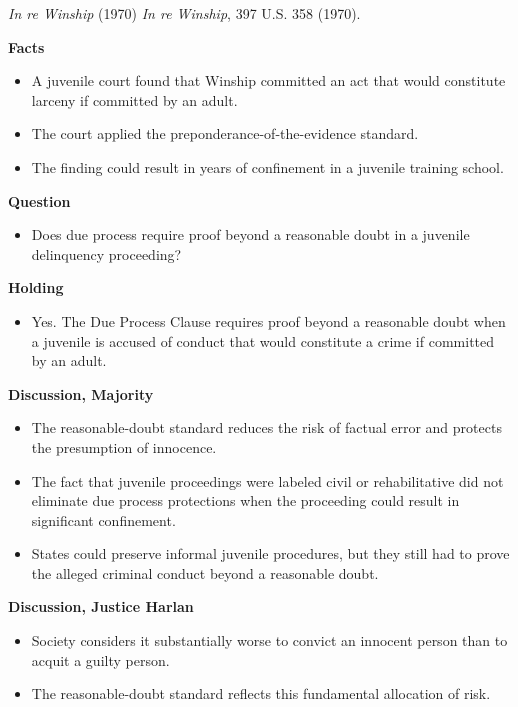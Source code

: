 \documentclass[11pt]{tex/lawoutline}
\begin{document}
\casebox
{\textit{In re Winship} (1970)}
{\textit{In re Winship}, 397 U.S. 358 (1970).}
{
\textbf{Facts}
\begin{itemize}
    \item A juvenile court found that Winship committed an act that would constitute larceny if committed by an adult.
    \item The court applied the preponderance-of-the-evidence standard.
    \item The finding could result in years of confinement in a juvenile training school.
\end{itemize}

\textbf{Question}
\begin{itemize}
    \item Does due process require proof beyond a reasonable doubt in a juvenile delinquency proceeding?
\end{itemize}

\textbf{Holding}
\begin{itemize}
    \item Yes. The Due Process Clause requires proof beyond a reasonable doubt when a juvenile is accused of conduct that would constitute a crime if committed by an adult.
\end{itemize}

\textbf{Discussion, Majority}{
\begin{itemize}
    \item The reasonable-doubt standard reduces the risk of factual error and protects the presumption of innocence.
    \item The fact that juvenile proceedings were labeled civil or rehabilitative did not eliminate due process protections when the proceeding could result in significant confinement.
    \item States could preserve informal juvenile procedures, but they still had to prove the alleged criminal conduct beyond a reasonable doubt.
\end{itemize}
}

\textbf{Discussion, Justice Harlan}{
\begin{itemize}
    \item Society considers it substantially worse to convict an innocent person than to acquit a guilty person.
    \item The reasonable-doubt standard reflects this fundamental allocation of risk.
\end{itemize}
}
}
\end{document}
